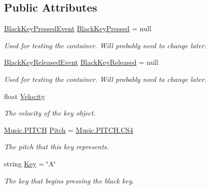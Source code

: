 \subsection*{Public Attributes}
\begin{DoxyCompactItemize}
\item 
\hyperlink{group___black_key_event_types_class_black_key_1_1_black_key_pressed_event}{Black\+Key\+Pressed\+Event} \hyperlink{group___black_key_events_ga51f1badf49df0c54e31a20ba4b7abd6b}{Black\+Key\+Pressed} = null
\begin{DoxyCompactList}\small\item\em Used for testing the container. Will probably need to change later. \end{DoxyCompactList}\item 
\hyperlink{group___black_key_event_types_class_black_key_1_1_black_key_released_event}{Black\+Key\+Released\+Event} \hyperlink{group___black_key_events_ga2710bdaba16dbdb82c0d38f11ce642d8}{Black\+Key\+Released} = null
\begin{DoxyCompactList}\small\item\em Used for testing the container. Will probably need to change later. \end{DoxyCompactList}\item 
float \hyperlink{group___black_key_pub_var_ga6fb983b09b3b6f80eab375fcb43010c1}{Velocity}
\begin{DoxyCompactList}\small\item\em The velocity of the key object. \end{DoxyCompactList}\item 
\hyperlink{group___music_enums_ga508f69b199ea518f935486c990edac1d}{Music.\+P\+I\+T\+CH} \hyperlink{group___black_key_pub_var_gad233c456182c9cef7c01486484940439}{Pitch} = \hyperlink{group___music_enums_gga508f69b199ea518f935486c990edac1da7009daf81333670cd06b8bb2b02054cc}{Music.\+P\+I\+T\+C\+H.\+C\+S4}
\begin{DoxyCompactList}\small\item\em The pitch that this key represents. \end{DoxyCompactList}\item 
string \hyperlink{group___black_key_pub_var_gaa541d3fb6cbb1361d5c062ce7b3c4e29}{Key} = \char`\"{}A\char`\"{}
\begin{DoxyCompactList}\small\item\em The key that begins pressing the black key. \end{DoxyCompactList}\end{DoxyCompactItemize}
